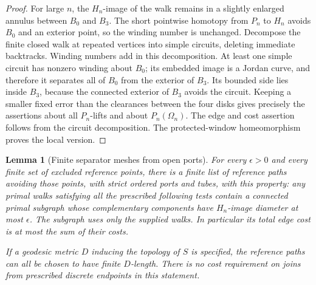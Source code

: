 \documentclass[11pt]{article}
\numberwithin{equation}{section}
\newtheorem{lemma}[theorem]{Lemma}
\theoremstyle{definition}
\theoremstyle{remark}
\newcommand{\1}{\mathbf 1}
\begin{document}
\begin{proof}
For large $n$, the $H_n$-image of the walk remains in a slightly
enlarged annulus between $B_0$ and $B_3$.  The short pointwise
homotopy from $P_n$ to $H_n$ avoids $B_0$ and an exterior point,
so the winding number is unchanged.  Decompose the finite closed
walk at repeated vertices into simple circuits, deleting immediate
backtracks.  Winding numbers add in this decomposition.  At least
one simple circuit has nonzero winding about $B_0$; its embedded
image is a Jordan curve, and therefore it separates all of $B_0$
from the exterior of $B_3$.  Its bounded side lies inside $B_3$,
because the connected exterior of $B_3$ avoids the circuit.
Keeping a smaller fixed error than the clearances between the
four disks gives precisely the assertions about all $P_n$-lifts
and about $P_n(\Omega_n)$.  The edge and cost assertion follows
from the circuit decomposition.  The protected-window
homeomorphism proves the local version.
\end{proof}

\begin{lemma}[Finite separator meshes from open ports]
\label{top:separator-mesh}
For every $\epsilon>0$ and every finite set of excluded reference
points, there is a finite list of reference paths avoiding those
points, with strict ordered ports and tubes, with this property:
any primal walks satisfying all the prescribed following tests
contain a connected primal subgraph whose complementary components
have $H_n$-image diameter at most $\epsilon$.
The subgraph uses only the supplied walks.  In particular its
total edge cost is at most the sum of their costs.

If a geodesic metric $D$ inducing the topology of $S$ is specified,
the reference paths can all be chosen to have finite $D$-length.
There is no cost requirement on joins from prescribed discrete
endpoints in this statement.
\end{lemma}
\end{document}
